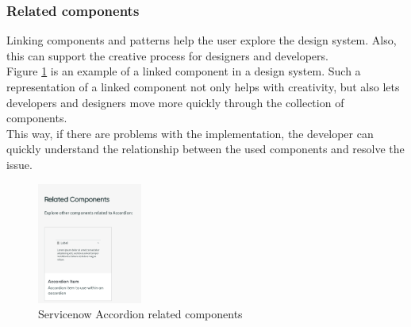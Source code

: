 \subsubsection{Related components} Linking components and patterns help the user explore the design system. Also, this can support the creative process for designers and developers. \\
Figure \ref{servicenow_accordion} is an example of a linked component in a design system. Such a representation of a linked component not only helps with creativity, but also lets developers and designers move more quickly through the collection of components. \\
This way, if there are problems with the implementation, the developer can quickly understand the relationship between the used components and resolve the issue. \cite{vesselov_building_2019}
\begin{figure}[htbp]
\centerline{\includegraphics[height=150px]{images/servicenow_accordion_related.png}}
\caption{Servicenow Accordion related components \cite{servicenow_servicenow_nodate}}
\label{servicenow_accordion}
\end{figure}

